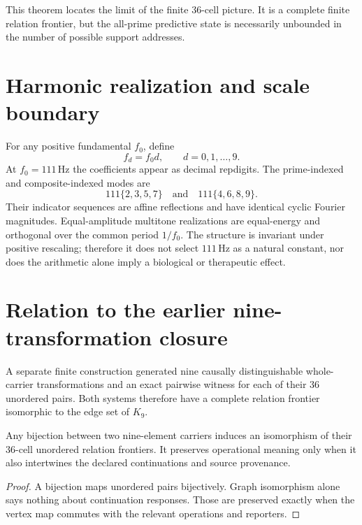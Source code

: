 \documentclass[11pt,a4paper]{article}
\begin{document}
This theorem locates the limit of the finite 36-cell picture. It is a complete finite relation frontier, but the all-prime predictive state is necessarily unbounded in the number of possible support addresses.

\section{Harmonic realization and scale boundary}
For any positive fundamental $f_0$, define
\begin{equation}
f_d=f_0d,\qquad d=0,1,\ldots,9.
\end{equation}
At $f_0=111\,\mathrm{Hz}$ the coefficients appear as decimal repdigits. The prime-indexed and composite-indexed modes are
\begin{equation}
111\{2,3,5,7\}\quad\text{and}\quad111\{4,6,8,9\}.
\end{equation}
Their indicator sequences are affine reflections and have identical cyclic Fourier magnitudes. Equal-amplitude multitone realizations are equal-energy and orthogonal over the common period $1/f_0$. The structure is invariant under positive rescaling; therefore it does not select $111\,\mathrm{Hz}$ as a natural constant, nor does the arithmetic alone imply a biological or therapeutic effect.

\section{Relation to the earlier nine-transformation closure}
A separate finite construction generated nine causally distinguishable whole-carrier transformations and an exact pairwise witness for each of their $36$ unordered pairs. Both systems therefore have a complete relation frontier isomorphic to the edge set of $K_9$.

\begin{proposition}
Any bijection between two nine-element carriers induces an isomorphism of their 36-cell unordered relation frontiers. It preserves operational meaning only when it also intertwines the declared continuations and source provenance.
\end{proposition}
\begin{proof}
A bijection maps unordered pairs bijectively. Graph isomorphism alone says nothing about continuation responses. Those are preserved exactly when the vertex map commutes with the relevant operations and reporters.
\end{proof}
\end{document}
